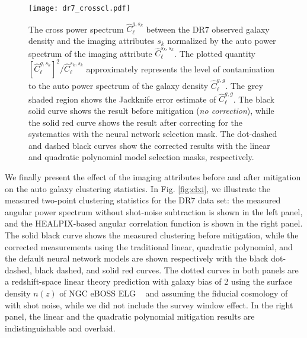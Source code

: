\documentclass[fleqn, usenatbib]{mnras}
\begin{document}
\begin{figure*}
\centering
\texttt{[image: dr7\_crosscl.pdf]}
\caption{The cross power spectrum $\hat{C}^{g,s_k}_{\ell}$ between the DR7 observed galaxy density and the imaging attributes $s_k$ normalized by the auto power spectrum of the imaging attribute $\hat{C}^{s_k,s_k}_{\ell}$. The plotted quantity $[\hat{C}^{g,s_k}_{\ell}]^2/\hat{C}^{s_k,s_k}_{\ell}$ approximately represents the level of contamination to the auto power spectrum of the galaxy density $\hat{C}^{g,g}_{\ell}$.  The grey shaded region shows the Jackknife error estimate of $\hat{C}^{g,g}_{\ell}$. The black solid curve shows the result before mitigation (\textit{no correction}), while the solid red curve shows the result after correcting for the systematics with the neural network selection mask. The dot-dashed and dashed black curves show the corrected results with the linear and quadratic polynomial model selection masks, respectively. \label{fig:clcross}}
\end{figure*}


We finally present the effect of the imaging attributes before and after mitigation on the auto galaxy clustering statistics. In Fig. \ref{fig:clxi}, we illustrate the measured two-point clustering statistics for the DR7 data set: the measured angular power spectrum without shot-noise subtraction is shown in the left panel, and the HEALPIX-based angular correlation function is shown in the right panel. The solid black curve shows the measured clustering before mitigation, while the corrected measurements using the traditional linear, quadratic polynomial, and the default neural network models are shown respectively with the black dot-dashed, black dashed, and solid red curves. The dotted curves in both panels are a redshift-space linear theory prediction with galaxy bias of 2 using the surface density $n(z)$ of NGC eBOSS ELG ~\citep[Tab. 4 of][]{Raichoor2017MNRAS.471.3955R} and assuming the fiducial cosmology of \citet{ross2011ameliorating,2012ApJ...761...14H} with shot noise, while we did not include the survey window effect. In the right panel, the linear and the quadratic polynomial mitigation results are indistinguishable and overlaid.\\ 
\end{document}

